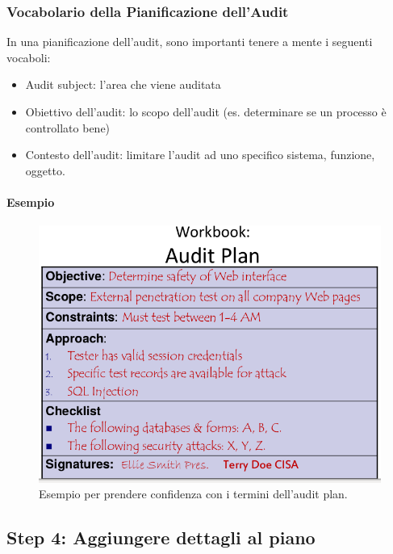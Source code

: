 \subsubsection{Vocabolario della Pianificazione dell'Audit}

In una pianificazione dell'audit, sono importanti tenere a mente i seguenti 
vocaboli:
\begin{itemize}
\item Audit subject: l'area che viene auditata
\item Obiettivo dell'audit: lo scopo dell'audit (es. determinare se un processo 
è controllato bene)
\item Contesto dell'audit: limitare l'audit ad uno specifico sistema, funzione, 
oggetto.
\end{itemize}

\paragraph*{Esempio}

\begin{figure}[h!]
	\begin{center}
		
\includegraphics[scale=0.4]{res/img/audit_plan_vocabulary_example.png}
	\end{center}
	\caption{Esempio per prendere confidenza con i termini dell'audit plan.}
	\label{fig:audit:plan:vocabulary:example}
\end{figure}






\subsection{Step 4: Aggiungere dettagli al piano}


